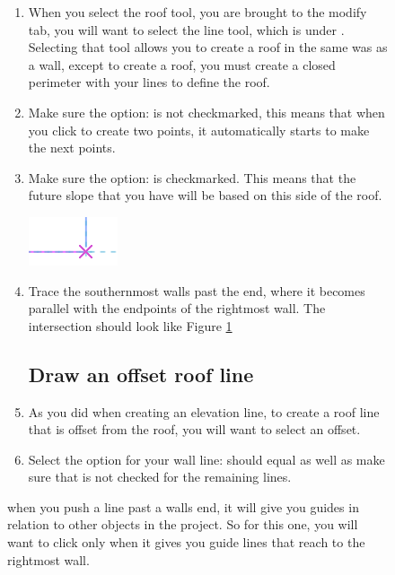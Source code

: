 \documentclass{tufte-book} %
\begin{document}
\begin{figure}
\begin{enumerate}
	\item When you select the roof tool, you are brought to the modify tab, you will want to select the line tool, which is under . Selecting that tool allows you to create a roof in the same was as a wall, except to create a roof, you must create a closed perimeter with your lines to define the roof.
	\item Make sure the option:  is not checkmarked, this means that when you click to create two points, it automatically starts to make the next points. 
	\item Make sure the option:  is checkmarked. This means that the future slope that you have will be based on this side of the roof.
	
	\begin{marginfigure}
		\includegraphics[width=\linewidth]{revitroofintersect.png}
		\caption[Revit Roof Intersection]{when you push a line past a walls end, it will give you guides in relation to other objects in the project. So for this one, you will want to click only when it gives you guide lines that reach to the rightmost wall.}
		\label{fig:revroofinter}
	\end{marginfigure}
	
	\item Trace the southernmost walls past the end, where it becomes parallel with the endpoints of the rightmost wall. The intersection should look like Figure \ref{fig:revroofinter}
	
	\subsection{Draw an offset roof line}
	
	\item As you did when creating an elevation line, to create a roof line that is offset from the roof, you will want to select an offset.
	\item Select the option for your wall line:  should equal  as well as make sure that  is not checked for the remaining lines.
	

\end{enumerate}
\end{figure}
\end{document}
